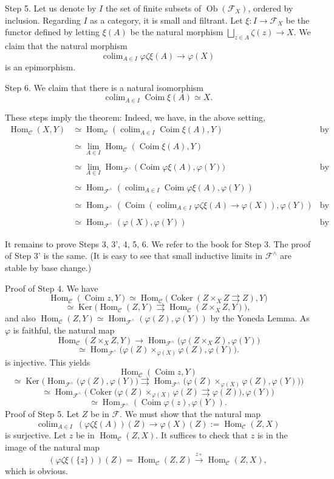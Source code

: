 \documentclass[12pt]{article}
\theoremstyle{remark}
\theoremstyle{definition}
\newcommand{\C}{\mathcal C}
\newcommand{\F}{\mathcal F}
\DeclareMathOperator*{\coli}{colim}
\DeclareMathOperator{\Coim}{Coim}
\DeclareMathOperator{\Coker}{Coker}
\DeclareMathOperator{\Hom}{Hom}%
\DeclareMathOperator{\Ker}{Ker}
\DeclareMathOperator{\Ob}{Ob}
\begin{document}
\noindent Step 5. Let us denote by $I$ the set of finite subsets of $\Ob(\F_X)$, ordered by inclusion. Regarding $I$ as a category, it is small and filtrant. Let $\xi:I\to\F_X$ be the functor defined by letting $\xi(A)$ be the natural morphism $\bigsqcup_{z\in A}\zeta(z)\to X$. We claim that the natural morphism 
$$
\coli_{A\in I}\varphi\zeta\xi(A)\to\varphi(X) 
$$ 
is an epimorphism.

\noindent Step 6. We claim that there is a natural isomorphism 
$$
\coli_{A\in I}\Coim\xi(A)\simeq X. 
$$

These steps imply the theorem: Indeed, we have, in the above setting, 
%
\begin{align*} 
%
\Hom_\C(X,Y)&\simeq\Hom_\C\left(\coli_{A\in I}\Coim\xi(A),Y\right)&\text{by Step 6}\\ \\ 
%
&\simeq\lim_{A\in I}\Hom_\C(\Coim\xi(A),Y)\\ \\ 
%
&\simeq\lim_{A\in I}\Hom_{\F^\wedge}\Big(\Coim\varphi\xi(A),\varphi(Y)\Big)&\text{by Step 4}\\ \\ 
%
&\simeq\Hom_{\F^\wedge}\left(\coli_{A\in I}\Coim\varphi\xi(A),\varphi(Y)\right)\\ \\ 
%
&\simeq\Hom_{\F^\wedge}\left(\Coim\left(\coli_{A\in I}\varphi\zeta\xi(A)\to\varphi(X)\right),\varphi(Y)\right)&\text{by Step 3'}\\ \\ 
%
&\simeq\Hom_{\F^\wedge}(\varphi(X),\varphi(Y))&\text{by Step 5.}
%
\end{align*} 
%

It remains to prove Steps 3, 3', 4, 5, 6. We refer to the book for Step 3. The proof of Step 3' is the same. (It is easy to see that small inductive limits in $\F^\wedge$ are stable by base change.) 

\noindent Proof of Step 4. We have 
$$
\Hom_\C(\Coim z,Y)\simeq\Hom_\C\big(\Coker(Z\times_XZ\rightrightarrows Z),Y\big)
$$
$$
\simeq\Ker\big(\Hom_\C(Z,Y)\rightrightarrows\Hom_\C(Z\times_XZ,Y)\big),
$$ 
and also $\Hom_\C(Z,Y)\simeq\Hom_{\F^\wedge}(\varphi(Z),\varphi(Y))$ by the Yoneda Lemma. As $\varphi$ is faithful, the natural map 
$$
\Hom_\C(Z\times_XZ,Y)\to\Hom_{\F^\wedge}\big(\varphi(Z\times_XZ),\varphi(Y)\big)
$$
$$
\simeq\Hom_{\F^\wedge}\big(\varphi(Z)\times_{\varphi(X)}\varphi(Z),\varphi(Y)\big).
$$ 
is injective. This yields 
$$
\Hom_\C(\Coim z,Y)
$$
$$
\simeq\Ker\Big(\Hom_{\F^\wedge}\big(\varphi(Z),\varphi(Y)\big)\rightrightarrows\Hom_{\F^\wedge}\big(\varphi(Z)\times_{\varphi(X)}\varphi(Z),\varphi(Y)\big)\Big)
$$
$$
\simeq\Hom_{\F^\wedge}\Big(\Coker\big(\varphi(Z)\times_{\varphi(X)}\varphi(Z)\rightrightarrows\varphi(Z)\big),\varphi(Y)\Big)
$$
$$
\simeq\Hom_{\F^\wedge}(\Coim\varphi(z),\varphi(Y)).
$$
Proof of Step 5. Let $Z$ be in $\F$. We must show that the natural map 
$$
\coli_{A\in I}\ (\varphi\zeta\xi(A))(Z)\to\varphi(X)(Z):=\Hom_\C(Z,X) 
$$
is surjective. Let $z$ be in $\Hom_\C(Z,X)$. It suffices to check that $z$ is in the image of the natural map 
$$
(\varphi\zeta\xi(\{z\}))(Z)=\Hom_\C(Z,Z)\xrightarrow{z\circ}\Hom_\C(Z,X),
$$
which is obvious. 
\end{document}
